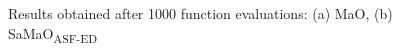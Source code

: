 \documentclass[onecolumn,10pt]{asme2ej}
\begin{document}
\begin{figure}[!htb]
	\centering    
	\caption{Results obtained after 1000 function evaluations: (a) MaO, (b) SaMaO\textsubscript{ASF-ED}}
	\label{fig:1000}
\end{figure}
\end{document}
